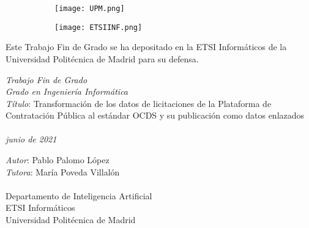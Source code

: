 \thispagestyle{empty} %

\begin{center}
    
    \centering
    \begin{figure}[h]
        \centering
        \begin{subfigure}[b]{0.5\linewidth}
            \centering
        	\texttt{[image: UPM.png]}
    	\end{subfigure}\hfill
    	\centering
        \begin{subfigure}[b]{0.5\linewidth}
            \centering
        	\texttt{[image: ETSIINF.png]}
        \end{subfigure}
	\end{figure}
	
	\printtitle
	
    \vfill
    
    \printauthor
    
    \printdate
\end{center}


    \vspace*{2cm}
    \noindent Este Trabajo Fin de Grado se ha depositado en la ETSI Informáticos de la Universidad Politécnica de Madrid para su defensa. \\
    
    \vspace*{10cm}
    
    \noindent \textit{Trabajo Fin de Grado} \\
    \textit{Grado en Ingeniería Informática} \\
    \textit{Título}: Transformación de los datos de licitaciones de la Plataforma de Contratación Pública al estándar OCDS y su publicación como datos enlazados \\ \\
    \textit{junio de 2021} \\
    
    \vspace*{2cm}
    
    \noindent \textit{Autor}: Pablo Palomo López \\
    \textit{Tutora}: María Poveda Villalón \\ \\
    Departamento de Inteligencia Artificial \\
    ETSI Informáticos \\
    Universidad Politécnica de Madrid \\
    
\thispagestyle{empty} %
\setcounter{page}{0}    %
\setcounter{figure}{0}  %